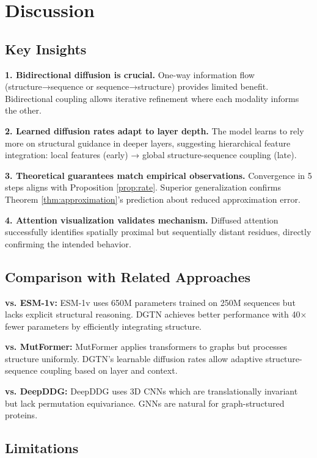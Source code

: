 \documentclass[12pt,en]{elegantpaper}
\begin{document}
\section{Discussion}

\subsection{Key Insights}

\textbf{1. Bidirectional diffusion is crucial.} One-way information flow (structure→sequence or sequence→structure) provides limited benefit. Bidirectional coupling allows iterative refinement where each modality informs the other.

\textbf{2. Learned diffusion rates adapt to layer depth.} The model learns to rely more on structural guidance in deeper layers, suggesting hierarchical feature integration: local features (early) → global structure-sequence coupling (late).

\textbf{3. Theoretical guarantees match empirical observations.} Convergence in 5 steps aligns with Proposition \ref{prop:rate}. Superior generalization confirms Theorem \ref{thm:approximation}'s prediction about reduced approximation error.

\textbf{4. Attention visualization validates mechanism.} Diffused attention successfully identifies spatially proximal but sequentially distant residues, directly confirming the intended behavior.

\subsection{Comparison with Related Approaches}

\textbf{vs. ESM-1v:} ESM-1v uses 650M parameters trained on 250M sequences but lacks explicit structural reasoning. DGTN achieves better performance with 40× fewer parameters by efficiently integrating structure.

\textbf{vs. MutFormer:} MutFormer applies transformers to graphs but processes structure uniformly. DGTN's learnable diffusion rates allow adaptive structure-sequence coupling based on layer and context.

\textbf{vs. DeepDDG:} DeepDDG uses 3D CNNs which are translationally invariant but lack permutation equivariance. GNNs are natural for graph-structured proteins.

\subsection{Limitations}
\end{document}
